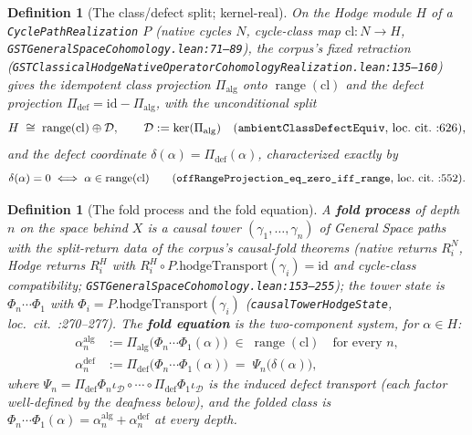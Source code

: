 \documentclass[11pt]{article}
\newtheorem{definition}[theorem]{Definition}
\begin{document}
\begin{definition}[The class/defect split; kernel-real]
\label{def:split}
On the Hodge module $H$ of a \texttt{CyclePathRealization} $P$ (native cycles $N$, cycle-class map $\mathrm{cl}:N\to H$, \texttt{GSTGeneralSpaceCohomology.lean:71--89}), the corpus's fixed retraction (\texttt{GSTClassicalHodgeNativeOperatorCohomologyRealization.lean:135--160}) gives the idempotent class projection $\Pi_{\mathrm{alg}}$ onto $\operatorname{range}(\mathrm{cl})$ and the defect projection $\Pi_{\mathrm{def}}=\mathrm{id}-\Pi_{\mathrm{alg}}$, with the unconditional split
\[
H \;\cong\; \operatorname{range}(\mathrm{cl}) \oplus \mathcal{D}, \qquad \mathcal{D}:=\ker(\Pi_{\mathrm{alg}}) \quad\text{(\texttt{ambientClassDefectEquiv}, loc.\ cit.\ :626),}
\]
and the defect coordinate $\delta(\alpha)=\Pi_{\mathrm{def}}(\alpha)$, characterized exactly by
\[
\delta(\alpha)=0 \iff \alpha\in\operatorname{range}(\mathrm{cl}) \qquad\text{(\texttt{offRangeProjection\_eq\_zero\_iff\_range}, loc.\ cit.\ :552).}
\]
\end{definition}

\begin{definition}[The fold process and the fold equation]
\label{def:equation}
A \textbf{fold process} of depth $n$ on the space behind $X$ is a causal tower $(\gamma_1,\dots,\gamma_n)$ of General Space paths with the split-return data of the corpus's causal-fold theorems (native returns $R^N_i$, Hodge returns $R^H_i$ with $R^H_i\circ P.\mathrm{hodgeTransport}(\gamma_i)=\mathrm{id}$ and cycle-class compatibility; \texttt{GSTGeneralSpaceCohomology.lean:153--255}); the tower state is $\Phi_n\cdots\Phi_1$ with $\Phi_i=P.\mathrm{hodgeTransport}(\gamma_i)$ (\texttt{causalTowerHodgeState}, loc.\ cit.\ :270--277). The \textbf{fold equation} is the two-component system, for $\alpha\in H$:
\[
\boxed{\;
\begin{aligned}
\alpha^{\mathrm{alg}}_n &:= \Pi_{\mathrm{alg}}\big(\Phi_n\cdots\Phi_1(\alpha)\big) \;\in\; \operatorname{range}(\mathrm{cl}) \quad\text{for every } n,\\[2pt]
\alpha^{\mathrm{def}}_n &:= \Pi_{\mathrm{def}}\big(\Phi_n\cdots\Phi_1(\alpha)\big) \;=\; \Psi_n\big(\delta(\alpha)\big),
\end{aligned}\;}
\]
where $\Psi_n=\Pi_{\mathrm{def}}\Phi_n\iota_{\mathcal{D}}\circ\cdots\circ\Pi_{\mathrm{def}}\Phi_1\iota_{\mathcal{D}}$ is the induced defect transport (each factor well-defined by the deafness below), and the folded class is $\Phi_n\cdots\Phi_1(\alpha)=\alpha^{\mathrm{alg}}_n+\alpha^{\mathrm{def}}_n$ at every depth.
\end{definition}
\end{document}
